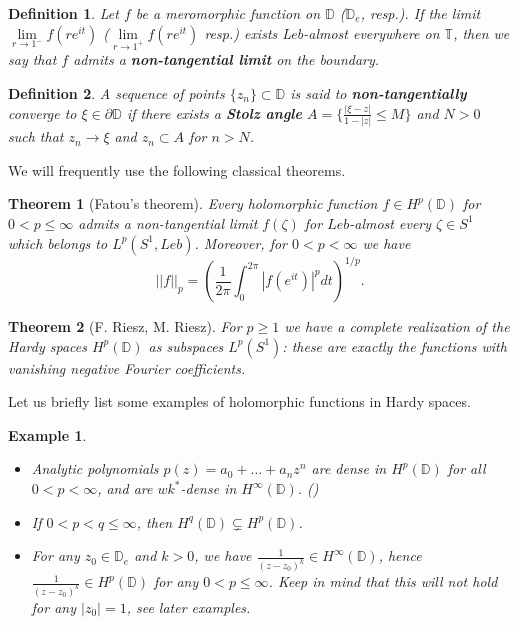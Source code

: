 \documentclass[11pt]{article}
\newtheorem{definition}{Definition}[section]
\newtheorem{theorem}{Theorem}[section]
\newtheorem{example}{Example}[section]
\begin{document}
\begin{definition}
	Let $f$ be a meromorphic function on $\mathbb{D}$ ($\mathbb{D}_e$, resp.). If the limit $\lim\limits_{r \rightarrow 1^-} f(r e^{it})$ ($\lim\limits_{r \rightarrow 1^+} f(r e^{it})$ resp.) exists Leb-almost everywhere on $\mathbb{T}$, then we say that $f$ admits a \textbf{non-tangential limit} on the boundary.
\end{definition}

\begin{definition}
	\label{D:non-tangential convergence}
	A sequence of points $\{z_n\} \subset \mathbb{D}$ is said to \textbf{non-tangentially} converge to $\xi \in \partial \mathbb{D}$ if there exists a \textbf{Stolz angle} $A = \{ \frac{|\xi - z|}{1 - |z|} \le M \}$ and $N > 0$ such that $z_n \rightarrow \xi$ and $z_n \subset A$ for $n > N$.
\end{definition}

We will frequently use the following classical theorems.

\begin{theorem}[Fatou's theorem]
	\label{T: Fatou theorem}
	Every holomorphic function $f \in H^p(\mathbb{D})$ for $0 < p \le \infty$ admits a non-tangential limit $f(\zeta)$ for $Leb$-almost every $\zeta \in S^1$ which belongs to $L^p(S^1, Leb)$. Moreover, for $0 < p < \infty$ we have
	\[
	||f||_p = \left( \frac{1}{2 \pi} \int_{0}^{2 \pi} |f(e^{i t})|^p dt\right)^{1/p} .
	\]
\end{theorem}

\begin{theorem}[F. Riesz, M. Riesz]
	\label{T: Riesz-Riesz theorem}
		For $p \ge 1$ we have a complete realization of the Hardy spaces $H^p(\mathbb{D})$ as subspaces $L^p(S^1)$: these are exactly the functions with vanishing negative Fourier coefficients.
\end{theorem}

Let us briefly list some examples of holomorphic functions in Hardy spaces.

\begin{example}
	\indent
	\begin{itemize}
		\item Analytic polynomials $p(z) = a_0 + \dots + a_n z^n$ are dense in $H^p(\mathbb{D})$ for all $0 < p < \infty$, and are $wk^*$-dense in $H^\infty(\mathbb{D})$. (\cite[Theorem 1.9.4]{book:738388})
		\item If $0 < p < q \le \infty$, then $H^q(\mathbb{D}) \subsetneq H^p(\mathbb{D})$.
		\item For any $z_0 \in \mathbb{D}_e$ and $k > 0$, we have $\frac{1}{(z - z_0)^k} \in H^\infty(\mathbb{D})$, hence $\frac{1}{(z - z_0)^k} \in H^p(\mathbb{D})$ for any $0 < p \le \infty$. Keep in mind that this will not hold for any $|z_0| = 1$, see later examples.
	\end{itemize}
\end{example}
\end{document}
